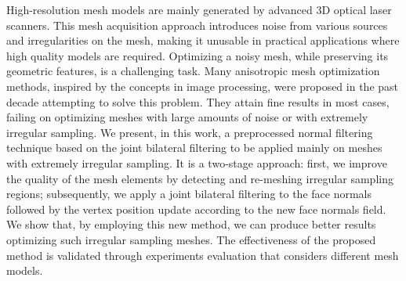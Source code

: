 High-resolution mesh models are mainly generated by advanced 3D optical laser scanners. This mesh acquisition approach introduces noise from various sources and irregularities on the mesh, making it unusable in practical applications where high quality models are required. Optimizing a noisy mesh, while preserving its geometric features, is a challenging task. Many anisotropic mesh optimization methods, inspired by the concepts in image processing, were proposed in the past decade attempting to solve this problem. They attain fine results in most cases, failing on optimizing meshes with large amounts of noise or with extremely irregular sampling. We present, in this work, a preprocessed normal filtering technique based on the joint bilateral filtering to be applied mainly on meshes with extremely irregular sampling. It is a two-stage approach: first, we improve the quality of the mesh elements by detecting and re-meshing irregular sampling regions; subsequently, we apply a joint bilateral filtering to the face normals followed by the vertex position update according to the new face normals field. We show that, by employing this new method, we can produce better results optimizing such irregular sampling meshes. The effectiveness of the proposed method is validated through experiments evaluation that considers different mesh models.

